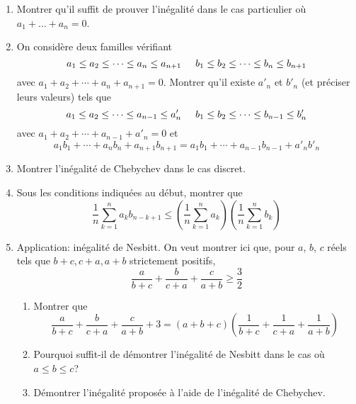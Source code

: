  \begin{enumerate}
  \item Montrer qu'il suffit de prouver l'inégalité dans le cas particulier où $a_1+\dots+a_n=0$.
  \item On considère deux familles vérifiant
\begin{displaymath}
 a_1 \leq a_2 \leq \cdots \leq a_n \leq a_{n+1} \hspace{0.5cm} b_1 \leq b_2 \leq \cdots \leq b_n \leq b_{n+1}
\end{displaymath}
avec $a_1 + a_2 + \cdots + a_n + a_{n+1}=0$.\newline
Montrer qu'il existe $a'_n$ et $b'_n$ (et préciser leurs valeurs) tels que
\begin{displaymath}
 a_1 \leq a_2 \leq \cdots \leq a_{n-1} \leq a'_{n} \hspace{0.5cm} b_1 \leq b_2 \leq \cdots \leq b_{n-1} \leq b'_{n}
\end{displaymath}
avec $a_1 + a_2 + \cdots + a_{n-1} + a'_{n}=0$ et
\begin{displaymath}
 a_1b_1 + \cdots + a_{n}b_n + a_{n+1}b_{n+1} = a_1b_1 + \cdots + a_{n-1}b_{n-1} + a'_nb'_n
\end{displaymath}
\item Montrer l'inégalité de Chebychev dans le cas discret.
\item Sous les conditions indiquées au début, montrer que
\begin{displaymath}
 \frac{1}{n}\sum_{k=1}^{n}a_k b_{n-k+1} \leq 
\left( \frac{1}{n}\sum_{k=1}^{n}a_k\right) 
\left( \frac{1}{n}\sum_{k=1}^{n}b_k\right)
\end{displaymath}

\item Application: inégalité de Nesbitt.\newline 
On veut montrer ici que, pour $a$, $b$, $c$ réels tels que $b+c, c+a, a+b$ strictement positifs,
\begin{displaymath}
 \frac{a}{b+c} + \frac{b}{c+a} + \frac{c}{a+b} \geq \frac{3}{2}
\end{displaymath}
\begin{enumerate}
 \item Montrer que
\begin{displaymath}
\frac{a}{b+c} + \frac{b}{c+a} + \frac{c}{a+b} +3 
=\left( a+b+c\right)\left( \frac{1}{b+c} + \frac{1}{c+a} + \frac{1}{a+b}\right)
\end{displaymath}
 \item Pourquoi suffit-il de démontrer l'inégalité de Nesbitt dans le cas où $a\leq b \leq c$?
 \item Démontrer l'inégalité proposée à l'aide de l'inégalité de Chebychev.
\end{enumerate} 
\end{enumerate}

